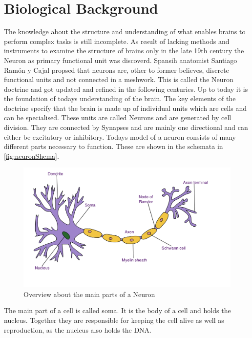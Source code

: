 \section{Biological Background}
The knowledge about the structure and understanding of what enables brains to perform complex tasks is still incomplete. As result of lacking methods and instruments to examine the structure of brains only in the late 19th century the Neuron as primary functional unit was discoverd. Spansih anatomist Santiago Ramón y Cajal propsed that neurons are, other to former believes, discrete functional units and not connected in a meshwork. This is called the Neuron doctrine and got updated and refined  in the following centuries\cite{10.2307/1757040}. Up to today it is the foundation of todays understanding of the brain. The key elements of the doctrine specify that the brain is made up of individual units which are cells and can be specialised. These units are called Neurons and are generated by cell division. They are connected by Synapses and are mainly one directional and can either be excitatory or inhibitory\cite{lopez2006neuron}.
\newline
Todays model of a neuron consists of many different parts necessary to function. These are shown in the schemata in \autoref{fig:neuronShema}.
\begin{figure}[htpb]
  \centering
  \includegraphics[width = \textwidth]{figures/Neuron.png}
  \caption{Overview about the main parts of a Neuron \cite{wikiNeuron}}
  \label{fig:neuronShema}
\end{figure}
The main part of a cell is called soma. It is the  body of a cell and holds the nucleus. Together they are responsible for keeping the cell alive as well as reproduction, as the nucleus also holds the DNA.
